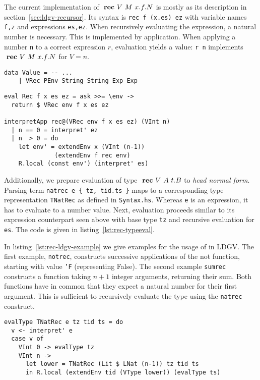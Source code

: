 The current implementation of $\text{ \textbf{rec} } V~M~x.f.N$ is mostly as its description in section~\ref{sec:ldgv-recursor}. Its syntax is \texttt{rec f (x.es) ez} with variable names \texttt{f,z} and expressions \texttt{es,ez}. When recursively evaluating the expression, a natural number is necessary. This is implemented by application. When applying a number \texttt{n} to a correct \rec expression $r$, evaluation yields a value: \texttt{r n} implements $\text{ \textbf{rec} } V~M~x.f.N$ for $V=n$.

\begin{lstlisting}[float,
	label=lst:rec-typeext,
	caption=Haskell: Introducing value representation of \\ \rec (\texttt{ProcessEnvironment.hs})]
data Value = -- ...
    | VRec PEnv String String Exp Exp
\end{lstlisting}

\begin{lstlisting}[float,
	label=lst:rec-eval,
	caption=Haskell: Evaluation of \rec (\texttt{Interpreter.hs})]
eval Rec f x es ez = ask >>= \env ->
  return $ VRec env f x es ez
  
interpretApp rec@(VRec env f x es ez) (VInt n)
  | n == 0 = interpret' ez
  | n  > 0 = do
    let env' = extendEnv x (VInt (n-1))
              (extendEnv f rec env)
    R.local (const env') (interpret' es)
\end{lstlisting}

Additionally, we prepare evaluation of type $\text{ \textbf{rec} } V~A~t.B$ to \emph{head normal form}. Parsing term \texttt{natrec e \{ tz, tid.ts \}} maps to a corresponding type representation \texttt{TNatRec} as defined in \texttt{Syntax.hs}. Whereas \texttt{e} is an expression, it has to evaluate to a number value. Next, evaluation proceeds similar to its expression counterpart seen above with base type \texttt{tz} and recursive evaluation for \texttt{es}. The code is given in listing~\ref{lst:rec-typeeval}.

In listing~\ref{lst:rec-ldgv-example} we give examples for the usage of \rec in  LDGV. The first example, \texttt{notrec}, constructs successive applications of the not function, starting with value \texttt{'F} (representing False). The second example \texttt{sumrec} constructs a function taking $n+1$ integer arguments, returning their sum. Both functions have in common that they expect a natural number for their first argument. This is sufficient to recursively evaluate the type using the \texttt{natrec} construct.

\begin{lstlisting}[float,
	label=lst:rec-typeeval,
	caption=Haskell: Evaluation of \rec type to HNF(\texttt{Interpreter.hs})]
evalType TNatRec e tz tid ts = do
  v <- interpret' e
  case v of
    VInt 0 -> evalType tz
    VInt n ->
      let lower = TNatRec (Lit $ LNat (n-1)) tz tid ts
      in R.local (extendEnv tid (VType lower)) (evalType ts)
\end{lstlisting}

